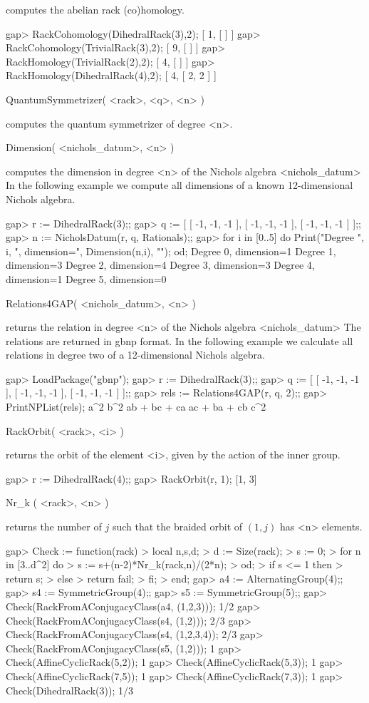 computes the abelian rack (co)homology. 

\beginexample
gap> RackCohomology(DihedralRack(3),2);
[ 1, [  ] ]
gap> RackCohomology(TrivialRack(3),2); 
[ 9, [  ] ]
gap> RackHomology(TrivialRack(2),2);
[ 4, [  ] ]
gap> RackHomology(DihedralRack(4),2);    
[ 4, [ 2, 2 ] ]
\endexample

\> QuantumSymmetrizer( <rack>, <q>, <n> )

computes the quantum symmetrizer of degree <n>.

\> Dimension( <nichols_datum>, <n> )

computes the dimension in degree <n> of the Nichols algebra <nichols_datum> In
the following example we compute all dimensions of a known 12-dimensional
Nichols algebra.

\beginexample
gap> r := DihedralRack(3);;
gap> q := [ [ -1, -1, -1 ], [ -1, -1, -1 ], [ -1, -1, -1 ] ];;
gap> n := NicholsDatum(r, q, Rationals);;
gap> for i in [0..5] do
Print("Degree ", i, ", dimension=", Dimension(n,i), "\n");
od;
Degree 0, dimension=1
Degree 1, dimension=3
Degree 2, dimension=4
Degree 3, dimension=3
Degree 4, dimension=1
Degree 5, dimension=0
\endexample

\> Relations4GAP( <nichols_datum>, <n> )

returns the relation in degree <n> of the Nichols algebra <nichols_datum> The
relations are returned in gbnp format.  In the following example we calculate
all relations in degree two of a 12-dimensional Nichols algebra.

\beginexample
gap> LoadPackage("gbnp");
gap> r := DihedralRack(3);;
gap> q := [ [ -1, -1, -1 ], [ -1, -1, -1 ], [ -1, -1, -1 ] ];;
gap> rels := Relations4GAP(r, q, 2);;
gap> PrintNPList(rels);
 a^2 
 b^2 
 ab + bc + ca 
 ac + ba + cb 
 c^2 
\endexample

\> RackOrbit( <rack>, <i> )

returns the orbit of the element <i>, given by the action of the inner group.

\beginexample
gap> r := DihedralRack(4);;
gap> RackOrbit(r, 1);
[1, 3]
\endexample

\>Nr_k ( <rack>, <n> )

returns the number of $j$ such that the braided orbit of $(1,j)$ 
has <n> elements.

\beginexample
gap> Check := function(rack)
> local n,s,d;
> d := Size(rack);
> s := 0;
> for n in [3..d^2] do
>   s := s+(n-2)*Nr_k(rack,n)/(2*n);
> od;
> if s <= 1 then
>   return s;
> else
>   return fail;
> fi;
> end;
gap> a4 := AlternatingGroup(4);;
gap> s4 := SymmetricGroup(4);;
gap> s5 := SymmetricGroup(5);;
gap> Check(RackFromAConjugacyClass(a4, (1,2,3)));
1/2
gap> Check(RackFromAConjugacyClass(s4, (1,2)));    
2/3
gap> Check(RackFromAConjugacyClass(s4, (1,2,3,4));
2/3
gap> Check(RackFromAConjugacyClass(s5, (1,2)));    
1
gap> Check(AffineCyclicRack(5,2));                            
1
gap> Check(AffineCyclicRack(5,3));
1
gap> Check(AffineCyclicRack(7,5));  
1
gap> Check(AffineCyclicRack(7,3));
1
gap> Check(DihedralRack(3));      
1/3
\endexample

